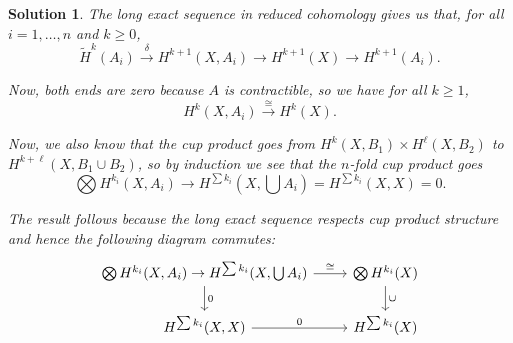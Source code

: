 \documentclass{article}
\theoremstyle{plain}
\theoremstyle{nonumberplain}
\newtheorem{sol}{Solution}
\begin{document}
\begin{sol}
The long exact sequence in reduced cohomology gives us that, for all $i = 1, \dots, n$ and $k \geq 0$,
\begin{equation}
\tilde H^k(A_i) \xrightarrow{\delta} H^{k+1}(X,A_i) \to H^{k+1}(X) \to H^{k+1}(A_i).
\end{equation}

Now, both ends are zero because $A$ is contractible, so we have for all $k \geq 1$,
\begin{equation}
H^k(X,A_i) \xrightarrow{\cong} H^k(X).
\end{equation}

Now, we also know that the cup product goes from $H^k(X,B_1) \times H^\ell(X,B_2)$ to $H^{k+\ell}(X,B_1 \cup B_2)$, so by induction we see that the $n$-fold cup product goes
\begin{equation}
\bigotimes H^{k_i}(X,A_i) \to H^{\sum k_i}(X, \bigcup A_i) = H^{\sum k_i}(X,X) = 0.
\end{equation}

The result follows because the long exact sequence respects cup product structure and hence the following diagram commutes:
\begin{equation}
\begin{tikzcd}
{\bigotimes H^{k_i}(X,A_i) \to H^{\sum k_i}(X, \bigcup A_i)} \arrow[d,"0"] \arrow[r,"\cong"] & \bigotimes H^{k_i}(X) \arrow[d,"\cup"] \\
{H^{\sum k_i}(X,X)} \arrow[r,"0"]                                                    & H^{\sum k_i}(X)                
\end{tikzcd}
\end{equation}
\end{sol}
\end{document}
